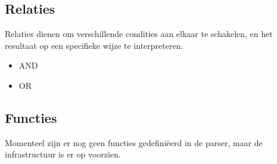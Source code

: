\subsection{Relaties}

Relaties dienen om verschillende condities aan elkaar te schakelen, en het resultaat op een specifieke wijze te interpreteren.

\begin{itemize}
\item AND
\item OR
\end{itemize}

\subsection{Functies}

Momenteel zijn er nog geen functies gedefini\"eerd in de parser, maar de infrastructuur is er op voorzien.


